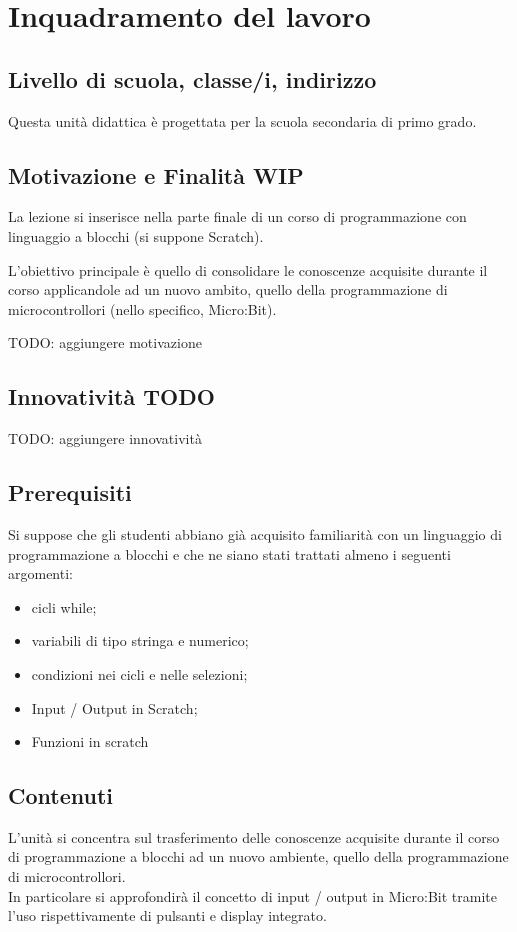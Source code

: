 \documentclass[../../relazione.tex]{subfiles}
\begin{document}
\section{Inquadramento del lavoro}

\subsection{Livello di scuola, classe/i, indirizzo}
Questa unità didattica è progettata per la scuola secondaria di primo grado.

\subsection{Motivazione e Finalità WIP}
La lezione si inserisce nella parte finale di un corso di programmazione con linguaggio a blocchi (si suppone Scratch).

L'obiettivo principale è quello di consolidare le conoscenze acquisite durante il corso applicandole ad un nuovo ambito, quello della programmazione di microcontrollori (nello specifico, Micro:Bit).

TODO: aggiungere motivazione

\subsection{Innovatività TODO}
TODO: aggiungere innovatività

\subsection{Prerequisiti}
Si suppose che gli studenti abbiano già acquisito familiarità con un linguaggio di programmazione a blocchi e che ne siano stati trattati almeno i seguenti argomenti:
\begin{itemize}
	\item cicli while;
	\item variabili di tipo stringa e numerico;
	\item condizioni nei cicli e nelle selezioni;
	\item Input / Output in Scratch;
	\item Funzioni in scratch
\end{itemize}

\subsection{Contenuti}
L'unità si concentra sul trasferimento delle conoscenze acquisite durante il corso di programmazione a blocchi ad un nuovo ambiente, quello della programmazione di microcontrollori.\\
In particolare si approfondirà il concetto di input / output in Micro:Bit tramite l'uso rispettivamente di pulsanti e display integrato. 
\end{document}

